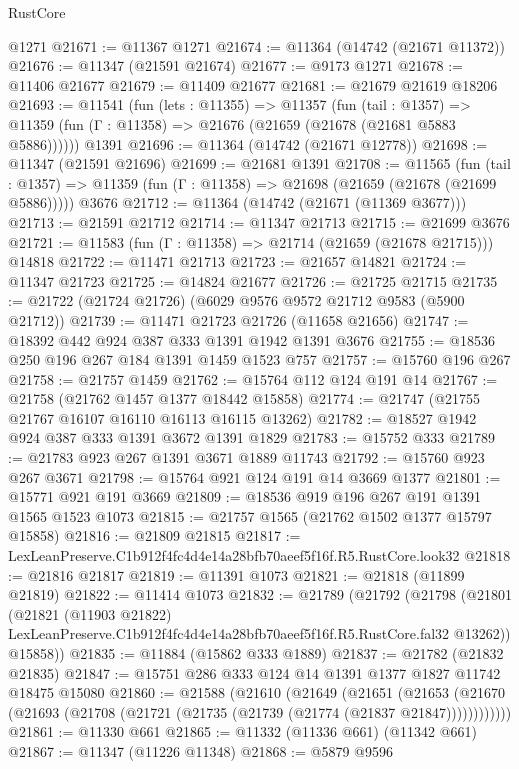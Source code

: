 \begin{lexlean}{RustCore}
\begin{coremodule}
    @1271
@21671 := @11367 @1271
@21674 := @11364 (@14742 (@21671 @11372))
@21676 := @11347 (@21591 @21674)
@21677 := @9173 @1271
@21678 := @11406 @21677
@21679 := @11409 @21677
@21681 := @21679 @21619 @18206
@21693 := @11541
    (fun (lets : @11355) =>
    @11357
      (fun (tail : @1357) =>
      @11359 (fun (Γ : @11358) => @21676 (@21659 (@21678 (@21681 @5883 @5886))))))
    @1391
@21696 := @11364 (@14742 (@21671 @12778))
@21698 := @11347 (@21591 @21696)
@21699 := @21681 @1391
@21708 := @11565
    (fun (tail : @1357) => @11359 (fun (Γ : @11358) => @21698 (@21659 (@21678 (@21699 @5886)))))
    @3676
@21712 := @11364 (@14742 (@21671 (@11369 @3677)))
@21713 := @21591 @21712
@21714 := @11347 @21713
@21715 := @21699 @3676
@21721 := @11583 (fun (Γ : @11358) => @21714 (@21659 (@21678 @21715))) @14818
@21722 := @11471 @21713
@21723 := @21657 @14821
@21724 := @11347 @21723
@21725 := @14824 @21677
@21726 := @21725 @21715
@21735 := @21722 (@21724 @21726) (@6029 @9576 @9572 @21712 @9583 (@5900 @21712))
@21739 := @11471 @21723 @21726 (@11658 @21656)
@21747 := @18392 @442 @924 @387 @333 @1391 @1942 @1391 @3676
@21755 := @18536 @250 @196 @267 @184 @1391 @1459 @1523 @757
@21757 := @15760 @196 @267
@21758 := @21757 @1459
@21762 := @15764 @112 @124 @191 @14
@21767 := @21758 (@21762 @1457 @1377 @18442 @15858)
@21774 := @21747 (@21755 @21767 @16107 @16110 @16113 @16115 @13262)
@21782 := @18527 @1942 @924 @387 @333 @1391 @3672 @1391 @1829
@21783 := @15752 @333
@21789 := @21783 @923 @267 @1391 @3671 @1889 @11743
@21792 := @15760 @923 @267 @3671
@21798 := @15764 @921 @124 @191 @14 @3669 @1377
@21801 := @15771 @921 @191 @3669
@21809 := @18536 @919 @196 @267 @191 @1391 @1565 @1523 @1073
@21815 := @21757 @1565 (@21762 @1502 @1377 @15797 @15858)
@21816 := @21809 @21815
@21817 := LexLeanPreserve.C1b912f4fc4d4e14a28bfb70aeef5f16f.R5.RustCore.look32
@21818 := @21816 @21817
@21819 := @11391 @1073
@21821 := @21818 (@11899 @21819)
@21822 := @11414 @1073
@21832 := @21789
    (@21792
      (@21798
        (@21801
          (@21821
            (@11903 @21822)
            LexLeanPreserve.C1b912f4fc4d4e14a28bfb70aeef5f16f.R5.RustCore.fal32
            @13262))
        @15858))
@21835 := @11884 (@15862 @333 @1889)
@21837 := @21782 (@21832 @21835)
@21847 := @15751 @286 @333 @124 @14 @1391 @1377 @1827 @11742 @18475 @15080
@21860 := @21588
    (@21610
      (@21649
        (@21651
          (@21653 (@21670 (@21693 (@21708 (@21721 (@21735 (@21739 (@21774 (@21837 @21847))))))))))))
@21861 := @11330 @661
@21865 := @11332 (@11336 @661) (@11342 @661)
@21867 := @11347 (@11226 @11348)
@21868 := @5879 @9596

\end{coremodule}
\end{lexlean}
